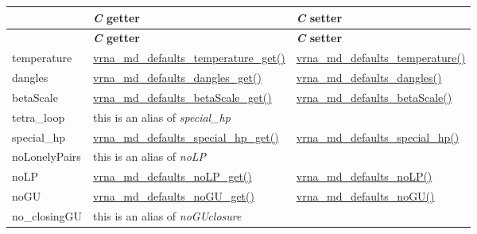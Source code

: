 \begin{DoxyRefList}
\tabulinesep=1mm
\begin{longtabu} spread 0pt [c]{*3{|X[-1]}|}
\hline
{}&{\bf {\itshape C} getter }&{\bf {\itshape C} setter  }\\
\endfirsthead
\hline
\endfoot
\hline
{}&{\bf {\itshape C} getter }&{\bf {\itshape C} setter  }\\
\endhead
temperature &\hyperlink{group__model__details_ga96b24a74437f9ba46c4e06343155bf46}{vrna\+\_\+md\+\_\+defaults\+\_\+temperature\+\_\+get()} &\hyperlink{group__model__details_gaf9e527e9a2f7e6fd6e42bc6e602f5445}{vrna\+\_\+md\+\_\+defaults\+\_\+temperature()} \\
dangles &\hyperlink{group__model__details_ga67ca06f95ae133778c79a4493c9817b8}{vrna\+\_\+md\+\_\+defaults\+\_\+dangles\+\_\+get()} &\hyperlink{group__model__details_gac76a5374def8e5e4e644ff6e4cc72dee}{vrna\+\_\+md\+\_\+defaults\+\_\+dangles()} \\
beta\+Scale &\hyperlink{group__model__details_gabb8780f5410c52f970d75b044059bd09}{vrna\+\_\+md\+\_\+defaults\+\_\+beta\+Scale\+\_\+get()} &\hyperlink{group__model__details_gae984567db36c3f9b8731ecc917abf3a2}{vrna\+\_\+md\+\_\+defaults\+\_\+beta\+Scale()} \\
tetra\+\_\+loop &this is an alias of {\itshape special\+\_\+hp} &\\
special\+\_\+hp &\hyperlink{group__model__details_ga1d68a6efdaa1253cc63fd9cd06452559}{vrna\+\_\+md\+\_\+defaults\+\_\+special\+\_\+hp\+\_\+get()} &\hyperlink{group__model__details_gafff6449a02744add0308e653230c15fc}{vrna\+\_\+md\+\_\+defaults\+\_\+special\+\_\+hp()} \\
no\+Lonely\+Pairs &this is an alias of {\itshape no\+LP} &\\
no\+LP &\hyperlink{group__model__details_ga934344888fbacaed538bbbfe910f2aa6}{vrna\+\_\+md\+\_\+defaults\+\_\+no\+L\+P\+\_\+get()} &\hyperlink{group__model__details_ga2f88ffc393ac9d7987849c965fd29ea8}{vrna\+\_\+md\+\_\+defaults\+\_\+no\+L\+P()} \\
no\+GU &\hyperlink{group__model__details_ga5faa7d4e536d7fe36ec25428c0cf2563}{vrna\+\_\+md\+\_\+defaults\+\_\+no\+G\+U\+\_\+get()} &\hyperlink{group__model__details_ga98218f85c7a957a1d1ddf4627fdf5a39}{vrna\+\_\+md\+\_\+defaults\+\_\+no\+G\+U()} \\
no\+\_\+closing\+GU &this is an alias of {\itshape no\+G\+Uclosure} &\\

\end{longtabu}
\end{DoxyRefList}
